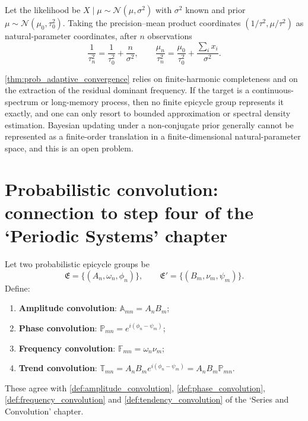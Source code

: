 \begin{example}\label{ex:gaussian_gaussian_prob}
Let the likelihood be $X\mid\mu\sim\mathcal N(\mu,\sigma^2)$ with $\sigma^2$ known and prior $\mu\sim\mathcal N(\mu_0,\tau_0^2)$. Taking the precision--mean product coordinates $(1/\tau^2,\mu/\tau^2)$ as natural-parameter coordinates, after $n$ observations
\[
\frac{1}{\tau_n^2}=\frac{1}{\tau_0^2}+\frac{n}{\sigma^2},\qquad
\frac{\mu_n}{\tau_n^2}=\frac{\mu_0}{\tau_0^2}+\frac{\sum_ix_i}{\sigma^2}.
\]
\end{example}

\begin{remark}\label{rem:prob_adaptive_boundary}
\cref{thm:prob_adaptive_convergence} relies on finite-harmonic completeness and on the extraction of the residual dominant frequency. If the target is a continuous-spectrum or long-memory process, then no finite epicycle group represents it exactly, and one can only resort to bounded approximation or spectral density estimation. Bayesian updating under a non-conjugate prior generally cannot be represented as a finite-order translation in a finite-dimensional natural-parameter space, and this is an open problem.
\end{remark}

\section{Probabilistic convolution: connection to step four of the `Periodic Systems' chapter}
\label{sec:prob_convolution}

\begin{definition}\label{def:prob_convolution_types}
Let two probabilistic epicycle groups be
\[
\mathfrak E=\{(A_n,\omega_n,\phi_n)\},\qquad
\mathfrak E'=\{(B_m,\nu_m,\psi_m)\}.
\]
Define:
\begin{enumerate}[label=(\roman*)]
    \item \textbf{Amplitude convolution}: $\mathbb A_{mn}=A_nB_m$;
    \item \textbf{Phase convolution}: $\mathbb P_{mn}=e^{i(\phi_n-\psi_m)}$;
    \item \textbf{Frequency convolution}: $\mathbb F_{mn}=\omega_n\nu_m$;
    \item \textbf{Trend convolution}: $\mathbb T_{mn}=A_nB_m e^{i(\phi_n-\psi_m)}=A_nB_m\mathbb P_{mn}$.
\end{enumerate}
These agree with \cref{def:amplitude_convolution}, \cref{def:phase_convolution}, \cref{def:frequency_convolution} and \cref{def:tendency_convolution} of the `Series and Convolution' chapter.
\end{definition}

